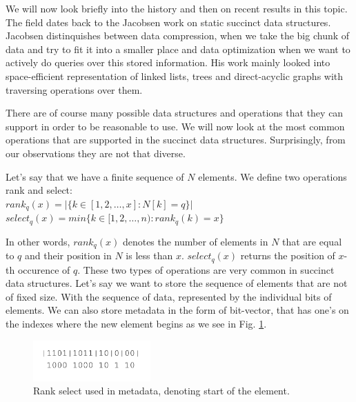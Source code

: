 We will now look briefly into the history and then on recent results in this topic. The field dates back to the Jacobsen work on static succinct data structures. Jacobsen distinquishes between data compression, when we take the big chunk of data and try to fit it into a smaller place and
data optimization when we want to actively do queries over this stored information. His work mainly looked into space-efficient representation of linked lists, trees and direct-acyclic graphs with traversing operations over them.

There are of course many possible data structures and operations that they can support in order to be reasonable to use. We will now look at the most common operations that are supported in the succinct data structures. Surprisingly, from our observations they are not that diverse.

\begin{theorem}
Let's say that we have a finite sequence of $N$ elements.
We define two operations rank and select: \\
$rank_q(x) = | \{ k \in [ 1, 2, \ldots, x]:N[k] = q  \} |$ \\
$select_q(x) = min \{ k \in [ 1, 2, \ldots, n):rank_q(k)=x  \} $
\end{theorem}

In other words, $rank_q(x)$ denotes the number of elements in $N$ that are equal to $q$ and their position in $N$ is less than $x$. $select_q(x)$ returns the position of $x$-th occurence of $q$.
These two types of operations are very common in succinct data structures. Let's say we want to store the sequence of elements that are not of fixed size.
With the sequence of data, represented by the individual bits of elements. We can also store metadata in the form of bit-vector, that has one's on the indexes
where the new element begins as we see in Fig. \ref{obr:obr_rank_select}.

\begin{figure}
\centerline{\includegraphics[width=0.4\textwidth]{images/obr_rank_select}}
\caption[Rank select usage in representation of sequence of elements with different size]{Rank select used in metadata, denoting start of the element.}
\label{obr:obr_rank_select}
\end{figure}

